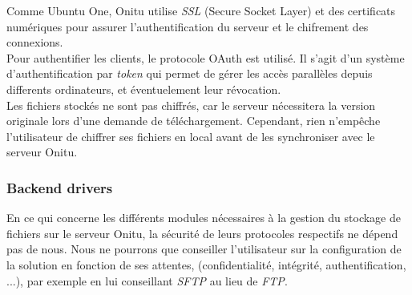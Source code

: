 Comme Ubuntu One, Onitu utilise \textit{SSL} (Secure Socket Layer) et des certificats numériques pour assurer l'authentification du serveur et le chifrement des connexions.\\

Pour authentifier les clients, le protocole OAuth est utilisé. Il s'agit d'un système d'authentification par \textit{token} qui permet de gérer les accès parallèles depuis differents ordinateurs, et éventuelement leur révocation.\\

Les fichiers stockés ne sont pas chiffrés, car le serveur nécessitera la version originale lors d'une demande de téléchargement. Cependant, rien n'empêche l'utilisateur de chiffrer ses fichiers en local avant de les synchroniser avec le serveur Onitu.

\subsubsection{Backend drivers}
En ce qui concerne les différents modules nécessaires à la gestion du stockage de fichiers sur le serveur Onitu, la sécurité de leurs protocoles respectifs ne dépend pas de nous. Nous ne pourrons que conseiller l'utilisateur sur la configuration de la solution en fonction de ses attentes, (confidentialité, intégrité, authentification, ...), par exemple en lui conseillant \textit{SFTP} au lieu de \textit{FTP}.
